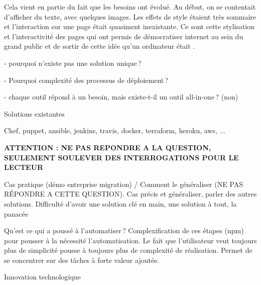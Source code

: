 Cela vient en partie du fait que les besoins ont évolué. Au début, on se contentait d'afficher du texte, avec quelques images. Les effets de style étaient très sommaire et l'interaction sur une page était quasiment inexistante. Ce sont cette stylisation et l'interactivité des pages qui ont permis de démocratiser internet au sein du grand public et de sortir de cette idée qu'un ordinateur était .


- pourquoi n'existe pas une solution unique ? 

- Pourquoi complexité des processus de déploiement ? 

- chaque outil répond à un besoin, mais existe-t-il un outil all-in-one ? (non)

Solutions existantes

Chef, puppet, ansible, jenkins, travis, docker, terraform, heroku, aws, ...


\textbf{ATTENTION : NE PAS REPONDRE A LA QUESTION, SEULEMENT SOULEVER DES INTERROGATIONS POUR LE LECTEUR}

Cas pratique (démo entreprise migration) / Comment le généraliser (NE PAS RÉPONDRE A CETTE QUESTION). Cas précis et généraliser, parler des autres solutions. Difficulté d'avoir une solution clé en main, une solution à tout, la panacée

Qu'est ce qui a poussé à l'automatiser ? Complexification de ces étapes (npm) pour pousser à la nécessité l'automatisation. Le fait que l'utilisateur veut toujours plus de simplicité pousse à toujours plus de complexité de réalisation. Permet de se concentrer sur des tâches à forte valeur ajoutée.

Innovation technologique 